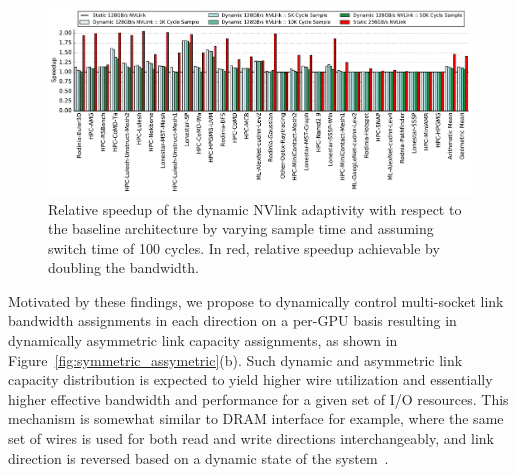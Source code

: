 \begin{figure}[tp]
    \centering
    \includegraphics[width=1.0\textwidth]{figures/plot_nvlink_sample_time.pdf}
    \caption{Relative speedup of the dynamic NVlink adaptivity with respect to
	the baseline architecture by varying sample time and assuming switch time of
	100 cycles. In red, relative speedup achievable by doubling the bandwidth.}
    \label{fig:sampletime}
\end{figure}

Motivated by these findings, we propose to dynamically control multi-socket
link bandwidth assignments in each direction on a per-GPU basis resulting in
dynamically asymmetric link capacity assignments, as shown in
Figure~\ref{fig:symmetric_assymetric}(b). Such dynamic and asymmetric link
capacity distribution is expected to yield higher wire utilization and
essentially higher effective bandwidth and performance for a given set of I/O
resources. This mechanism is somewhat similar to DRAM interface for example,
where the same set of wires is used for both read and write directions
interchangeably, and link direction is reversed based on a dynamic state of the
system~\cite{}. 

